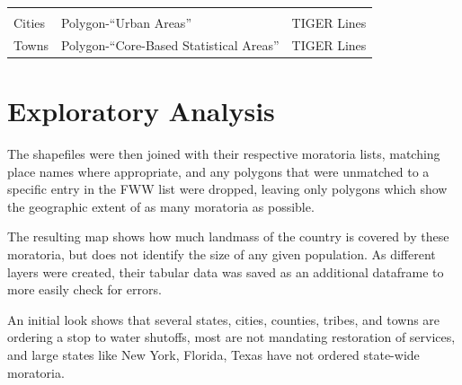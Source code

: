 \documentclass[
  12pt,
]{article}
\begin{document}
\begin{longtable}[]{@{}lll@{}}
\begin{minipage}[t]{0.09\columnwidth}
\end{minipage}\tabularnewline
\begin{minipage}[t]{0.24\columnwidth}\raggedright
Cities\strut
\end{minipage} & \begin{minipage}[t]{0.58\columnwidth}\raggedright
Polygon-``Urban Areas''\strut
\end{minipage} & \begin{minipage}[t]{0.09\columnwidth}\raggedright
TIGER Lines\strut
\end{minipage}\tabularnewline
\begin{minipage}[t]{0.24\columnwidth}\raggedright
Towns\strut
\end{minipage} & \begin{minipage}[t]{0.58\columnwidth}\raggedright
Polygon-``Core-Based Statistical Areas''\strut
\end{minipage} & \begin{minipage}[t]{0.09\columnwidth}\raggedright
TIGER Lines\strut
\end{minipage}\tabularnewline
\bottomrule
\end{longtable}

\newpage

\hypertarget{exploratory-analysis}{%
\section{Exploratory Analysis}\label{exploratory-analysis}}

The shapefiles were then joined with their respective moratoria lists,
matching place names where appropriate, and any polygons that were
unmatched to a specific entry in the FWW list were dropped, leaving only
polygons which show the geographic extent of as many moratoria as
possible.

The resulting map shows how much landmass of the country is covered by
these moratoria, but does not identify the size of any given population.
As different layers were created, their tabular data was saved as an
additional dataframe to more easily check for errors.

An initial look shows that several states, cities, counties, tribes, and
towns are ordering a stop to water shutoffs, most are not mandating
restoration of services, and large states like New York, Florida, Texas
have not ordered state-wide moratoria. \newpage
\end{document}
